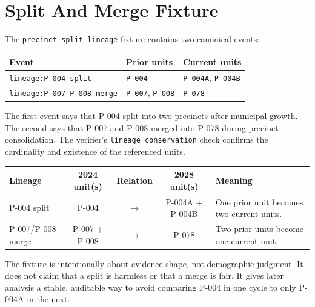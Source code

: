 \section{Split And Merge Fixture}

The \texttt{precinct-split-lineage} fixture contains two canonical events:

\begin{center}
\small
\begin{tabularx}{\textwidth}{lXX}
\toprule
Event & Prior units & Current units \\
\midrule
\texttt{lineage:P-004-split} & \texttt{P-004} & \texttt{P-004A}, \texttt{P-004B} \\
\texttt{lineage:P-007-P-008-merge} & \texttt{P-007}, \texttt{P-008} & \texttt{P-078} \\
\bottomrule
\end{tabularx}
\end{center}

The first event says that P-004 split into two precincts after municipal
growth. The second says that P-007 and P-008 merged into P-078 during precinct
consolidation. The verifier's \texttt{lineage\_conservation} check confirms the
cardinality and existence of the referenced units.

\begin{center}
\small
\begin{tabularx}{\textwidth}{lcccX}
\toprule
Lineage & 2024 unit(s) & Relation & 2028 unit(s) & Meaning \\
\midrule
P-004 split & P-004 & $\rightarrow$ & P-004A + P-004B & One prior unit becomes two current units. \\
P-007/P-008 merge & P-007 + P-008 & $\rightarrow$ & P-078 & Two prior units become one current unit. \\
\bottomrule
\end{tabularx}
\end{center}

The fixture is intentionally about evidence shape, not demographic judgment. It
does not claim that a split is harmless or that a merge is fair. It gives later
analysis a stable, auditable way to avoid comparing P-004 in one cycle to only
P-004A in the next.
